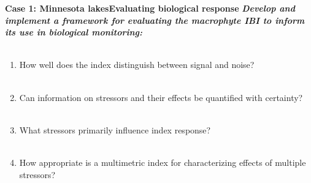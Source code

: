 \documentclass[serif]{beamer}\usepackage[]{graphicx}\usepackage[]{color}
\begin{document}
\begin{frame}{\textbf{Case 1: Minnesota lakes}}{\textbf{Evaluating biological response}}
\onslide<+->
\textbf{\emph{Develop and implement a framework for evaluating the macrophyte IBI to inform its use in biological monitoring:}} \\~\\
\begin{enumerate}
\onslide<+->
\item How well does the index distinguish between signal and noise? \\~\\
\onslide<+->
\item Can information on stressors and their effects be quantified with certainty? \\~\\
\onslide<+->
\item What stressors primarily influence index response? \\~\\
\onslide<+->
\item How appropriate is a multimetric index for characterizing effects of multiple stressors?
\end{enumerate}
\end{frame}
\end{document}
